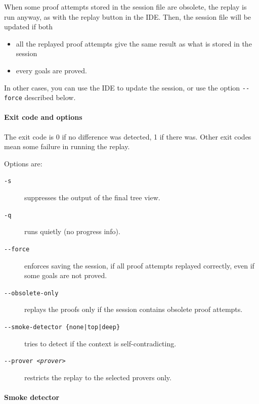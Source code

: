 When some proof attempts stored in the session file are
obsolete,
the replay is run anyway, as with the replay button in the IDE. Then, the session
file will be updated if both
\begin{itemize}
\item all the replayed proof attempts give the same result as what
  is stored in the session
\item every goals are proved.
\end{itemize}
In other cases, you can use the IDE to update the session, or use the
option \verb|--force| described below.

\paragraph{Exit code and options}

The exit code is 0 if no difference was detected, 1 if there
was. Other exit codes mean some failure in running the replay.

Options are:
\begin{description}
\item[\texttt{-s}] suppresses the output of the final tree view.
\item[\texttt{-q}] runs quietly (no progress info).
\item[\texttt{-{}-force}] enforces saving the session, if all proof
  attempts replayed correctly, even if some goals are not proved.
\item[\texttt{-{}-obsolete-only}] replays the proofs only if the session
  contains obsolete proof attempts.
\item[\texttt{-{}-smoke-detector \{none|top|deep\}}] tries to detect
  if the context is self-contradicting.
\item[\texttt{-{}-prover \textsl{<prover>}}] restricts the replay to the
  selected provers only.
\end{description}

\paragraph{Smoke detector}

